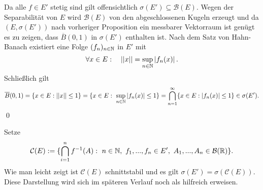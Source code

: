 \begin{proof*}%
    Da alle $f \in E'$ stetig sind gilt offensichtlich $\sigma(E') \subseteq \mathcal{B}(E)$. 
    Wegen der Separabilität von $E$ wird $\mathcal{B}(E)$ von den abgeschlossenen Kugeln erzeugt und da $(E, \sigma(E'))$ nach vorheriger Proposition ein messbarer Vektorraum ist genügt es zu zeigen, 
    dass $\overline{B}(0,1)$ in $\sigma(E')$ enthalten ist. Nach dem Satz von Hahn-Banach existiert eine Folge $(f_n)_{n \in \mathbb{N}}$ in $E'$ mit
    $$
        \forall x \in E: \quad \lvert\lvert x \rvert\rvert = \sup_{n \in \mathbb{N}}\left| f_n(x) \right|.
    $$
    Schließlich gilt 
    $$
        \overline{B}(0,1) = \{ x \in E: \lvert\lvert x \rvert\rvert \leq 1 \} = \{x \in E: \ \sup_{n \in \mathbb{N}}\left| f_n(x) \right| \leq 1 \} = \bigcap_{n=1}^{\infty}\{x \in E: \left| f_n(x) \right| \leq 1\} \in \sigma(E').
    $$
    \qed 
\end{proof*}

\begin{remark}
    Setze 
    $$
        \mathcal{C}(E) := \{ \bigcap_{i=1}^n f^{-1}(A): \ n \in \N, \ f_1,...,f_n \in E', \ A_1,...,A_n \in \mathcal{B}(\R) \}.
    $$
    Wie man leicht zeigt ist $\mathcal{C}(E)$ schnittstabil und es gilt $\sigma(E') = \sigma(\mathcal{C}(E))$. 
    Diese Darstellung wird sich im späteren Verlauf noch als hilfreich erweisen. 
\end{remark}